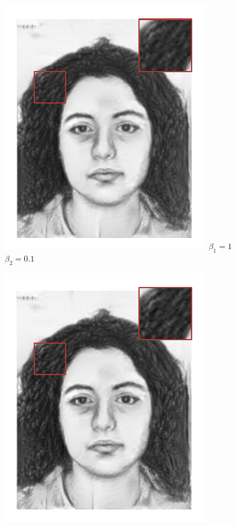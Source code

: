 \documentclass[10pt,twocolumn,letterpaper]{article}
\begin{document}
\begin{figure}[htbp]
\begin{minipage}[t]{0.16\linewidth}
\includegraphics[width=0.99\linewidth]{img/effective_eval/1_alpha.pdf}
$\beta_1  = 1 $\\
$\beta_2  = 0.1 $
\end{minipage}
\begin{minipage}[t]{0.16\linewidth}
\centering
\includegraphics[width=0.99\linewidth]{img/effective_eval/0_alpha.pdf}

\end{minipage}
\end{figure}
\end{document}
